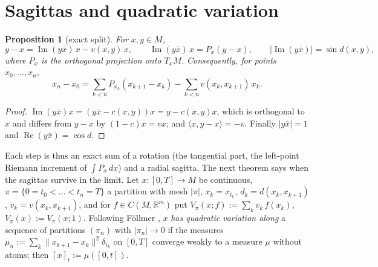 \documentclass[11pt,reqno]{amsart}
\newtheorem{proposition}[theorem]{Proposition}
\theoremstyle{definition}
\theoremstyle{remark}
\numberwithin{equation}{section}
\newcommand{\R}{\mathbb{R}}
\newcommand{\re}{\operatorname{Re}}
\newcommand{\im}{\operatorname{Im}}
\newcommand{\ip}[2]{\langle #1,#2\rangle}
\begin{document}
\setcounter{section}{6}
\renewcommand{\thesection}{\arabic{section}}
\renewcommand{\theHsection}{\arabic{section}}

\section{Sagittas and quadratic variation}

\begin{proposition}[exact split]\label{prop:split}
For $x,y\in M$,
\[
y-x=\im(y\bar x)\,x-v(x,y)\,x,\qquad \im(y\bar x)\,x=P_x(y-x),\qquad \lvert\im(y\bar x)\rvert=\sin d(x,y),
\]
where $P_x$ is the orthogonal projection onto $T_xM$.  Consequently, for points $x_0,\dots,x_n$,
\[
x_n-x_0=\sum_{k<n}P_{x_k}(x_{k+1}-x_k)-\sum_{k<n}v(x_k,x_{k+1})\,x_k .
\]
\end{proposition}
\begin{proof}
$\im(y\bar x)x=(y\bar x-c(x,y))x=y-c(x,y)x$, which is orthogonal to $x$ and differs from $y-x$ by
$(1-c)x=vx$; and $\ip x{y-x}=-v$.  Finally $\lvert y\bar x\rvert=1$ and $\re(y\bar x)=\cos d$.
\end{proof}

Each step is thus an exact sum of a rotation (the tangential part, the left-point Riemann increment of
$\int P_x\,dx$) and a radial sagitta.  The next theorem says when the sagittas survive in the limit.  Let
$x\colon[0,T]\to M$ be continuous, $\pi=\{0=t_0<\dots<t_n=T\}$ a partition with mesh $\lvert\pi\rvert$,
$x_k=x_{t_k}$, $d_k=d(x_k,x_{k+1})$, $v_k=v(x_k,x_{k+1})$, and for $f\in C(M,\R^m)$ put
$V_\pi(x;f):=\sum_kv_k\,f(x_k)$, $V_\pi(x):=V_\pi(x;1)$.  Following F\"ollmer \cite{Follmer}, $x$
\emph{has quadratic variation along} a sequence of partitions $(\pi_n)$ with $\lvert\pi_n\rvert\to0$ if the
measures $\mu_n:=\sum_k\lVert x_{k+1}-x_k\rVert^2\delta_{t_k}$ on $[0,T]$ converge weakly to a measure $\mu$
without atoms; then $[x]_t:=\mu([0,t])$.
\end{document}
